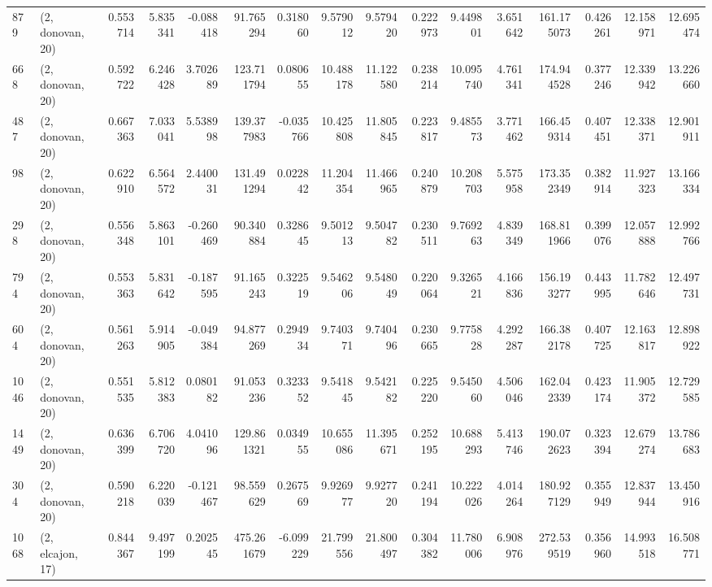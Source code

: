 \begin{tabular}{llrrrrrrrrrrrrrr}
879  &  (2, donovan, 20) &   0.553714 &   5.835341 &  -0.088418 &     91.765294 &    0.318060 &    9.579012 &    9.579420 &  0.222973 &   9.449801 &   3.651642 &   161.175073 &   0.426261 &  12.158971 &  12.695474 \\
668  &  (2, donovan, 20) &   0.592722 &   6.246428 &   3.702689 &    123.711794 &    0.080655 &   10.488178 &   11.122580 &  0.238214 &  10.095740 &   4.761341 &   174.944528 &   0.377246 &  12.339942 &  13.226660 \\
487  &  (2, donovan, 20) &   0.667363 &   7.033041 &   5.538998 &    139.377983 &   -0.035766 &   10.425808 &   11.805845 &  0.223817 &   9.485573 &   3.771462 &   166.459314 &   0.407451 &  12.338371 &  12.901911 \\
98   &  (2, donovan, 20) &   0.622910 &   6.564572 &   2.440031 &    131.491294 &    0.022842 &   11.204354 &   11.466965 &  0.240879 &  10.208703 &   5.575958 &   173.352349 &   0.382914 &  11.927323 &  13.166334 \\
298  &  (2, donovan, 20) &   0.556348 &   5.863101 &  -0.260469 &     90.340884 &    0.328645 &    9.501213 &    9.504782 &  0.230511 &   9.769263 &   4.839349 &   168.811966 &   0.399076 &  12.057888 &  12.992766 \\
794  &  (2, donovan, 20) &   0.553363 &   5.831642 &  -0.187595 &     91.165243 &    0.322519 &    9.546206 &    9.548049 &  0.220064 &   9.326521 &   4.166836 &   156.193277 &   0.443995 &  11.782646 &  12.497731 \\
604  &  (2, donovan, 20) &   0.561263 &   5.914905 &  -0.049384 &     94.877269 &    0.294934 &    9.740371 &    9.740496 &  0.230665 &   9.775828 &   4.292287 &   166.382178 &   0.407725 &  12.163817 &  12.898922 \\
1046 &  (2, donovan, 20) &   0.551535 &   5.812383 &   0.080182 &     91.053236 &    0.323352 &    9.541845 &    9.542182 &  0.225220 &   9.545060 &   4.506046 &   162.042339 &   0.423174 &  11.905372 &  12.729585 \\
1449 &  (2, donovan, 20) &   0.636399 &   6.706720 &   4.041096 &    129.861321 &    0.034955 &   10.655086 &   11.395671 &  0.252195 &  10.688293 &   5.413746 &   190.072623 &   0.323394 &  12.679274 &  13.786683 \\
304  &  (2, donovan, 20) &   0.590218 &   6.220039 &  -0.121467 &     98.559629 &    0.267569 &    9.926977 &    9.927720 &  0.241194 &  10.222026 &   4.014264 &   180.927129 &   0.355949 &  12.837944 &  13.450916 \\
1068 &  (2, elcajon, 17) &   0.844367 &   9.497199 &   0.202545 &    475.261679 &   -6.099229 &   21.799556 &   21.800497 &  0.304382 &  11.780006 &   6.908976 &   272.539519 &   0.356960 &  14.993518 &  16.508771 \\

\end{tabular}
